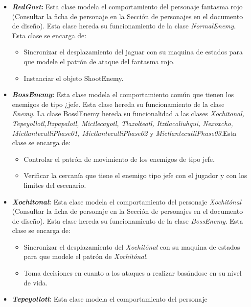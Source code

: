 \begin{itemize}
			\item \textbf{\textit{RedGost}:} Esta clase modela el comportamiento del personaje 
			fantasma rojo (Consultar la ficha de personaje en la Sección de personajes en 
			el documento de diseño). Esta clase hereda su funcionamiento de la clase 
			\textit{NormalEnemy}. Esta clase se encarga de:  
			\begin{itemize}
				\item Sincronizar el desplazamiento del jaguar con su maquina de estados para que modele
				el patrón de ataque del fantasma rojo.
				\item Instanciar el objeto ShootEnemy. 
			\end{itemize}
			\item \textbf{\textit{BossEnemy}:} Esta clase modela el comportamiento común que 
			tienen los enemigos de tipo ¿jefe. Esta clase hereda su funcionamiento de 
			la clase \textit{Enemy}. La clase BosslEnemy hereda su funcionalidad a las clases 
			\textit{ Xochitonal, Tepeyollotl,Itzpapalotl, Mictlecayotl, Tlazolteotl, 
			Itztlacoliuhqui, Nexoxcho, MictlantecutliPhase01, MictlantecutliPhase02} 
			y \textit{MictlantecutliPhase03}.Esta clase se encarga de:  
			\begin{itemize}
				\item Controlar el patrón de movimiento de los enemigos de tipo 
				jefe.
				\item  Verificar la cercanía que tiene el enemigo tipo jefe con el jugador 
				y con los limites del escenario.
			\end{itemize}	
			\item \textbf{\textit{Xochitonal}:} Esta clase modela el comportamiento del personaje 
			\textit{Xochitónal} (Consultar la ficha de personaje en la Sección de personajes en 
			el documento de diseño). Esta clase hereda su funcionamiento de la clase 
			\textit{BossEnemy}. Esta clase se encarga de:  
			\begin{itemize}
				\item Sincronizar el desplazamiento del \textit{Xochitónal} con su maquina 
				de estados para que modele el patrón de \textit{Xochitónal}.
				\item Toma decisiones en cuanto a los ataques a realizar basándose en su 
				nivel de vida.
			\end{itemize}
			\item \textbf{\textit{Tepeyollotl}:} Esta clase modela el comportamiento del personaje 

\end{itemize}

